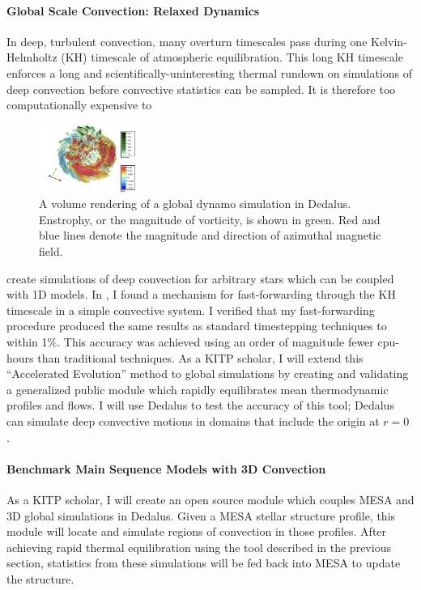 \documentclass[preprint, hmargin=1in, vmargin=1in]{aastex62}
\begin{document}
\paragraph{Global Scale Convection: Relaxed Dynamics}
In deep, turbulent convection, many overturn timescales pass during one Kelvin-Helmholtz (KH) timescale of atmospheric equilibration.
This long KH timescale enforces a long and scientifically-uninteresting thermal rundown on simulations of deep convection before convective statistics can be sampled.
It is therefore too computationally expensive to  
\begin{figure}
	\begin{center}
	\vspace{-20pt}
    \includegraphics[width=0.28\textwidth]{./figs/mdwarf.png}
	\vspace{-16pt}
	\end{center}
    \caption{A volume rendering of a global dynamo simulation in Dedalus.
	Enstrophy, or the magnitude of vorticity, is shown in green.
	Red and blue lines denote the magnitude and direction of azimuthal magnetic field.
	\label{fig:mdwarf} }
	\vspace{-16pt}
\end{figure}
create simulations of deep convection for arbitrary stars which can be coupled with 1D models.
In \citet{anders&all2018}, I found a mechanism for fast-forwarding through the KH timescale in a simple convective system.
I verified that my fast-forwarding procedure produced the same results as standard timestepping techniques to within 1\%.
This accuracy was achieved using an order of magnitude fewer cpu-hours than traditional techniques.
As a KITP scholar, I will extend this ``Accelerated Evolution'' method \citep{anders&all2018} to global simulations by creating and validating a generalized public module which rapidly equilibrates mean thermodynamic profiles and flows.
I will use Dedalus to test the accuracy of this tool; Dedalus can simulate deep convective motions in domains that include the origin at $r = 0$ \citep[as visualized in Fig.~\ref{fig:mdwarf}, and tested in][]{lecoanet&all2019}.

\paragraph{Benchmark Main Sequence Models with 3D Convection}
As a KITP scholar, I will create an open source module which couples MESA and 3D global simulations in Dedalus.
Given a MESA stellar structure profile, this module will locate and simulate regions of convection in those profiles.
After achieving rapid thermal equilibration using the tool described in the previous section, statistics from these simulations will be fed back into MESA to update the structure.
\end{document}
